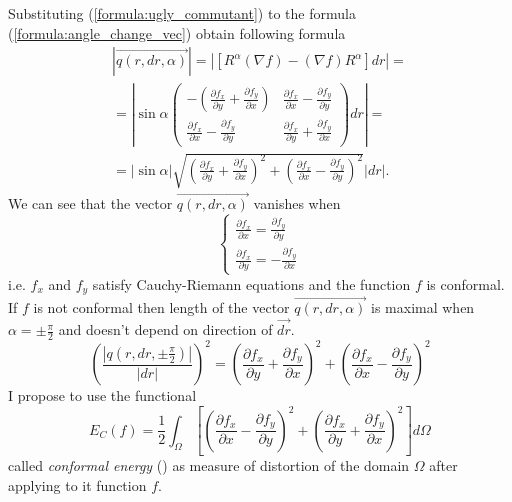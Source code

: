 \documentclass{article}
\newcommand{\vect}{\overrightarrow}
\begin{document}
Substituting (\ref{formula:ugly_commutant}) to the formula (\ref{formula:angle_change_vec}) obtain following formula
\begin{multline*} 
  \left| \vect{q(r, dr, \alpha)} \right| = \left| \left[R^\alpha (\nabla f) - (\nabla f) R^\alpha \right] dr \right| = \\
  = \left| \sin \alpha \begin{pmatrix}
    -(\frac{\partial f_x}{\partial y} + \frac{\partial f_y}{\partial x}) &
    \frac{\partial f_x}{\partial x} - \frac{\partial f_y}{\partial y} \\
    \frac{\partial f_x}{\partial x} - \frac{\partial f_y}{\partial y} &
    \frac{\partial f_x}{\partial y} + \frac{\partial f_y}{\partial x} 
  \end{pmatrix} dr \right| = \\
  = |\sin \alpha| \sqrt{\left(\frac{\partial f_x}{\partial y} + \frac{\partial f_y}{\partial x}\right)^2 + \left(\frac{\partial f_x}{\partial x} - \frac{\partial f_y}{\partial y}\right)^2} \left| dr \right|.
\end{multline*}
We can see that the vector $\vect{q(r, dr, \alpha)}$ vanishes when 
$$\begin{cases}
  \frac{\partial f_x}{\partial x} = \frac{\partial f_y}{\partial y} \\
  \frac{\partial f_x}{\partial y} = -\frac{\partial f_y}{\partial x} 
\end{cases}$$
i.e. $f_x$ and $f_y$ satisfy Cauchy-Riemann equations and the function $f$ is conformal. If $f$ is not conformal then length of the vector $\vect{q(r, dr, \alpha)}$ is maximal when $\alpha = \pm \frac{\pi}{2}$ 
and doesn't depend on direction of $\vect{dr}$. 
\begin{equation*}
  \left(\frac{\left| {q(r, dr, \pm \frac{\pi}{2})} \right|}{|dr|}\right)^2 = 
  \left(\frac{\partial f_x}{\partial y} + \frac{\partial f_y}{\partial x}\right)^2 + \left(\frac{\partial f_x}{\partial x} - \frac{\partial f_y}{\partial y}\right)^2 
\end{equation*}
I propose to use the functional 
\begin{equation*}
  E_C(f) = \frac{1}{2} \int_{\Omega}\left[{\left(\frac{\partial f_x}{\partial x} - \frac{\partial f_y}{\partial y}\right)^2 + \left(\frac{\partial f_x}{\partial y} + \frac{\partial f_y}{\partial x}\right)^2}\right] d\Omega   
\end{equation*}
called \textit{conformal energy} (\cite{Polthier}) as measure of distortion of the domain $\Omega$ after applying to it function $f$.
\end{document}
